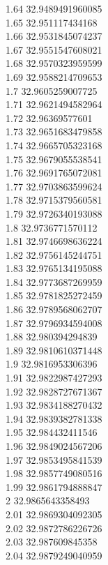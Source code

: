 {1.64	32.9489491960085\\
1.65	32.951117434168\\
1.66	32.9531845074237\\
1.67	32.9551547608021\\
1.68	32.9570323959599\\
1.69	32.9588214709653\\
1.7	32.9605259007725\\
1.71	32.9621494582964\\
1.72	32.96369577601\\
1.73	32.9651683479858\\
1.74	32.9665705323168\\
1.75	32.9679055538541\\
1.76	32.9691765072081\\
1.77	32.9703863599624\\
1.78	32.9715379560581\\
1.79	32.9726340193088\\
1.8	32.9736771570112\\
1.81	32.9746698636224\\
1.82	32.9756145244751\\
1.83	32.9765134195088\\
1.84	32.9773687269959\\
1.85	32.9781825272459\\
1.86	32.9789568062707\\
1.87	32.9796934594008\\
1.88	32.980394294839\\
1.89	32.9810610371448\\
1.9	32.9816953306396\\
1.91	32.9822987427293\\
1.92	32.9828727671367\\
1.93	32.9834188270432\\
1.94	32.9839382781338\\
1.95	32.984432411546\\
1.96	32.9849024567206\\
1.97	32.9853495841539\\
1.98	32.9857749080516\\
1.99	32.9861794888847\\
2	32.9865643358493\\
2.01	32.9869304092305\\
2.02	32.9872786226726\\
2.03	32.987609845358\\
2.04	32.9879249040959\\
}

